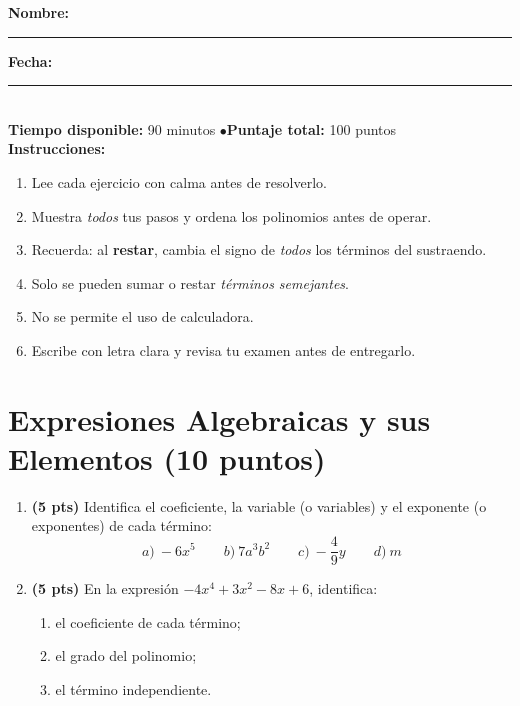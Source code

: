 \documentclass[12pt, letterpaper]{article}
\begin{document}


\vspace{4pt}
\begin{cuadroinfo}
  \small
  \textbf{Nombre:} \rule{0.55\linewidth}{0.4pt} \quad \textbf{Fecha:} \rule{0.15\linewidth}{0.4pt} \\[6pt]
  \textbf{Tiempo disponible:} 90 minutos \quad$\bullet$\quad \textbf{Puntaje total:} 100 puntos \\[4pt]
  \textbf{Instrucciones:}
  \begin{enumerate}[leftmargin=*]
    \item Lee cada ejercicio con calma antes de resolverlo.
    \item Muestra \emph{todos} tus pasos y ordena los polinomios antes de operar.
    \item Recuerda: al \textbf{restar}, cambia el signo de \emph{todos} los términos del sustraendo.
    \item Solo se pueden sumar o restar \emph{términos semejantes}.
    \item No se permite el uso de calculadora.
    \item Escribe con letra clara y revisa tu examen antes de entregarlo.
  \end{enumerate}
\end{cuadroinfo}

\vspace{8pt}

\section{Expresiones Algebraicas y sus Elementos (10 puntos)}

\begin{enumerate}[leftmargin=*]
  \item \textbf{(5 pts)} Identifica el coeficiente, la variable (o variables) y el exponente (o exponentes) de cada término:
        \[
          a)\ -6x^5 \qquad b)\ 7a^3b^2 \qquad c)\ -\frac{4}{9}y \qquad d)\ m
        \]

  \item \textbf{(5 pts)} En la expresión $-4x^4 + 3x^2 - 8x + 6$, identifica:
        \begin{enumerate}[label=\alph*)]
          \item el coeficiente de cada término;
          \item el grado del polinomio;
          \item el término independiente.
        \end{enumerate}
\end{enumerate}
\end{document}
